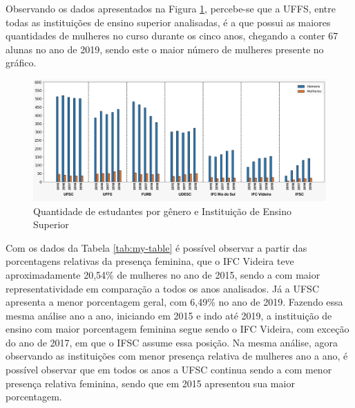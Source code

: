 \documentclass[a4paper]{article}
\begin{document}
Observando os dados apresentados na Figura \ref{fig:MulheresHomens}, percebe-se que a UFFS, entre todas as instituições de ensino superior analisadas, é a que possui as maiores quantidades de mulheres no curso durante os cinco anos, chegando a conter 67 alunas no ano de 2019, sendo este o maior número de mulheres presente no gráfico.

\begin{figure}[ht]
\centering
\includegraphics[width=1\textwidth]{Grafico.png}
\caption{Quantidade de estudantes por gênero e Instituição de Ensino Superior}
\label{fig:MulheresHomens}
\end{figure}

Com os dados da Tabela \ref{tab:my-table} é possível observar a partir das porcentagens relativas da presença feminina, que o IFC Videira teve aproximadamente 20,54\% de mulheres no ano de 2015, sendo a com maior representatividade em comparação a todos os anos analisados. Já a UFSC apresenta a menor porcentagem geral, com 6,49\% no ano de 2019.
Fazendo essa mesma análise ano a ano, iniciando em 2015 e indo até 2019, a instituição de ensino com maior porcentagem feminina segue sendo o IFC Videira, com exceção do ano de 2017, em que o IFSC assume essa posição. Na mesma análise, agora observando as instituições com menor presença relativa de mulheres ano a ano, é possível observar que em todos os anos a UFSC continua sendo a com menor presença relativa feminina, sendo que em 2015 apresentou sua maior porcentagem.
\end{document}
